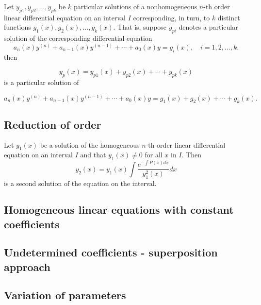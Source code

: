 \documentclass{article}
\begin{document}
\begin{thm} 
    Let \(y_{p1}, y_{p2}, \ldots, y_{pk}\) be \(k\) particular solutions of a nonhomogeneous \(n\)-th order linear differential equation on an interval \(I\) corresponding, in turn, to \(k\) distinct functions \(g_1(x), g_2(x), \ldots, g_k(x)\). That is, suppose \(y_{pi}\) denotes a particular solution of the corresponding differential equation
    \begin{equation}
        a_n(x)y^{(n)} + a_{n-1}(x)y^{(n-1)} + \cdots + a_0(x)y = g_i(x), \quad i = 1, 2, \ldots, k.
    \end{equation}
    then
    
    \begin{equation}
        y_p(x) = y_{p1}(x) + y_{p2}(x) + \cdots + y_{pk}(x)
    \end{equation}
    is a particular solution of
    
    \begin{equation}
        a_n(x)y^{(n)} + a_{n-1}(x)y^{(n-1)} + \cdots + a_0(x)y = g_1(x) + g_2(x) + \cdots + g_k(x).
    \end{equation}
\end{thm}

\subsection{Reduction of order}

\begin{thm} 
    Let \(y_1(x)\) be a solution of the homogeneous \(n\)-th order linear differential equation on an interval \(I\) and that \(y_1(x) \neq 0\) for all \(x\) in \(I\). Then
    \begin{equation}
        y_2(x) = y_1(x) \int \frac{e^{-\int P(x)dx}}{y_1^2(x)}dx
    \end{equation}
    is a second solution of the equation on the interval.
\end{thm}

\subsection{Homogeneous linear equations with constant coefficients}
\subsection{Undetermined coefficients - superposition approach}
\subsection{Variation of parameters}
\end{document}
